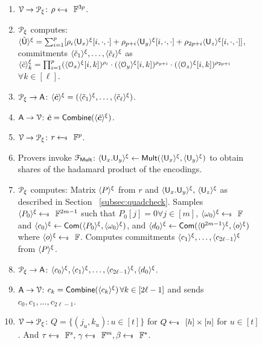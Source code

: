 \begin{figure*}[h]
{\begin{framed}
			\begin{enumerate}[{\rm 1.}]
				\item $\verifier\rightarrow\distprover$: $\rho\sample \FF^{3p}$.
				\item $\distprover$ computes: $\shr{\tilde{\ewit}} =\sum_{i=1}^p[\rho_i\shr{\ewit_x}[i,\cdot,\cdot] + \rho_{p+i}\shr{\ewit_y}[i,\cdot,\cdot]+\rho_{2p+i} \shr{\ewit_z}[i,\cdot,\cdot]]$, commitments $\shr{\tilde{c}_1},\ldots,\shr{\tilde{c}_\ell}$ as $\shr{\tilde{c}}_k = \prod_{i=1}^{p} ( \shr{\comoracle_x} [i,k] )^{\rho_i} \cdot (\shr{\comoracle_y}[i,k])^{\rho_{p+i}} \cdot (\shr{\comoracle_z}[i,k])^{\rho_{2p+i}}$ $\forall k\in[\ell]$.
				\item $\distprover\rightarrow\Ag$: $\shr{\tilde{\bm{c}}} = (\shr{\tilde{c}_1},\ldots,\shr{\tilde{c}_\ell})$.
				\item  {$\Ag\rightarrow\verifier$: $\tilde{\bm{c}}=\combine(\shr{\tilde{\bm{c}}})$.} 
				\item $\verifier\rightarrow\distprover$: $r\sample \FF^p$.
				\item Provers invoke $\FMult$: $\shr{\ewit_x.\ewit_y} \leftarrow \mathsf{Mult}(\shr{\ewit_x},\shr{\ewit_y})$ to obtain shares of the hadamard product of the encodings.
				\item $\distprover$ computes: Matrix $\shr{P}$ from $r$ and $\shr{\ewit_x.\ewit_y}, \, \shr{\ewit_z}$ as described in Section ~\ref{subsec:quadcheck}. Samples $\shr{P_0}\sample \FF^{2m-1}$ such that $P_0[j]=0 \forall j\in[m]$, $\shr{\omega_0} \sample \FF$ and $\shr{c_0}\gets \comm(\shr{P_0},\shr{\omega_0})$,  and 
				$\shr{d_0}\gets \comm(\shr{0^{2m-1}},\shr{o})$ where $\shr{o} \sample \FF$. Computes commitments $\shr{c_1},\ldots,\shr{c_{2\ell-1}}$ from $\shr{P}$.
				\item $\distprover\rightarrow\Ag$: $\shr{c_0} ,\shr{c_1} ,\ldots, \shr{c_{2\ell-1}}, \shr{d_0}$.
				\item  {$\Ag\rightarrow\verifier$: $c_k = \combine(\shr{c_k}) \, \forall k\in [2\ell-1]$ and sends $c_0,c_1,\ldots,c_{2\ell-1}$.}
				\item $\verifier\rightarrow\distprover$: $Q=\{(j_u,k_u):u\in [t]\}$ for $Q\sample [h]\times [n]$ for $u\in [t]$. And $\tau \sample \FF^s, \, \gamma \sample \FF^m, \beta\sample \FF^\ast$.

\end{enumerate}
\end{framed}}
\end{figure*}
